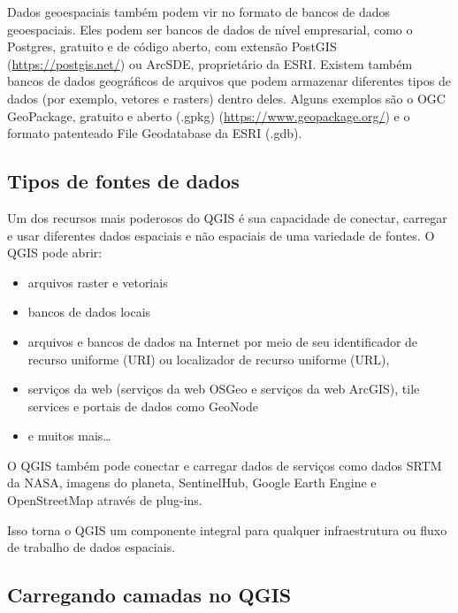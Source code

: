 \documentclass[
  portuguese,
]{krantz}
\providecommand{\tightlist}{%
  \setlength{\itemsep}{0pt}\setlength{\parskip}{0pt}}
\begin{document}
Dados geoespaciais também podem vir no formato de bancos de dados geoespaciais. Eles podem ser bancos de dados de nível empresarial, como o Postgres, gratuito e de código aberto, com extensão PostGIS (\url{https://postgis.net/}) ou ArcSDE, proprietário da ESRI. Existem também bancos de dados geográficos de arquivos que podem armazenar diferentes tipos de dados (por exemplo, vetores e rasters) dentro deles. Alguns exemplos são o OGC GeoPackage, gratuito e aberto (.gpkg) (\url{https://www.geopackage.org/}) e o formato patenteado File Geodatabase da ESRI (.gdb).

\hypertarget{tipos-de-fontes-de-dados}{%
\subsection{\texorpdfstring{\textbf{Tipos de fontes de dados}}{Tipos de fontes de dados}}\label{tipos-de-fontes-de-dados}}

Um dos recursos mais poderosos do QGIS é sua capacidade de conectar, carregar e usar diferentes dados espaciais e não espaciais de uma variedade de fontes. O QGIS pode abrir:

\begin{itemize}
\tightlist
\item
  arquivos raster e vetoriais
\item
  bancos de dados locais
\item
  arquivos e bancos de dados na Internet por meio de seu identificador de recurso uniforme (URI) ou localizador de recurso uniforme (URL),
\item
  serviços da web (serviços da web OSGeo e serviços da web ArcGIS), tile services e portais de dados como GeoNode
\item
  e muitos mais\ldots{}
\end{itemize}

O QGIS também pode conectar e carregar dados de serviços como dados SRTM da NASA, imagens do planeta, SentinelHub, Google Earth Engine e OpenStreetMap através de plug-ins.

Isso torna o QGIS um componente integral para qualquer infraestrutura ou fluxo de trabalho de dados espaciais.

\hypertarget{carregando-camadas-no-qgis}{%
\subsection{\texorpdfstring{\textbf{Carregando camadas no QGIS}}{Carregando camadas no QGIS}}\label{carregando-camadas-no-qgis}}
\end{document}
